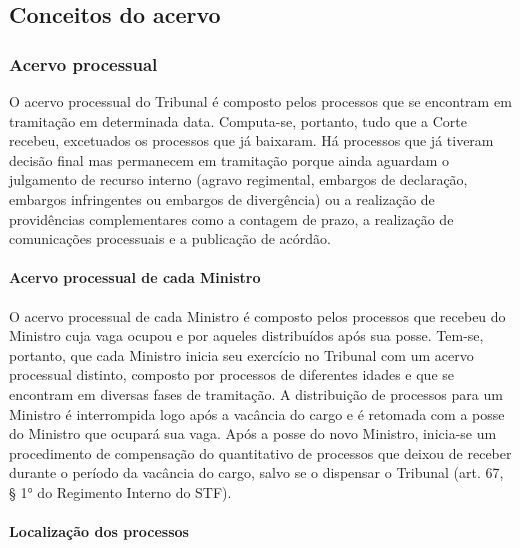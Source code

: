 \documentclass[
]{book}
\begin{document}
\hypertarget{conceitos-do-acervo}{%
\subsection{Conceitos do acervo}\label{conceitos-do-acervo}}

\hypertarget{acervo-processual}{%
\subsubsection{Acervo processual}\label{acervo-processual}}

O acervo processual do Tribunal é composto pelos processos que se encontram em tramitação em determinada data. Computa-se, portanto, tudo que a Corte recebeu, excetuados os processos que já baixaram.
Há processos que já tiveram decisão final mas permanecem em tramitação porque ainda aguardam o julgamento de recurso interno (agravo regimental, embargos de declaração, embargos infringentes ou embargos de divergência) ou a realização de providências complementares como a contagem de prazo, a realização de comunicações processuais e a publicação de acórdão.

\hypertarget{acervo-processual-de-cada-ministro}{%
\paragraph{Acervo processual de cada Ministro}\label{acervo-processual-de-cada-ministro}}

O acervo processual de cada Ministro é composto pelos processos que recebeu do Ministro cuja vaga ocupou e por aqueles distribuídos após sua posse.
Tem-se, portanto, que cada Ministro inicia seu exercício no Tribunal com um acervo processual distinto, composto por processos de diferentes idades e que se encontram em diversas fases de tramitação. A distribuição de processos para um Ministro é interrompida logo após a vacância do cargo e é retomada com a posse do Ministro que ocupará sua vaga. Após a posse do novo Ministro, inicia-se um procedimento de compensação do quantitativo de processos que deixou de receber durante o período da vacância do cargo, salvo se o dispensar o Tribunal (art. 67, § 1° do Regimento Interno do STF).

\hypertarget{localizauxe7uxe3o-dos-processos}{%
\paragraph{Localização dos processos}\label{localizauxe7uxe3o-dos-processos}}
\end{document}
